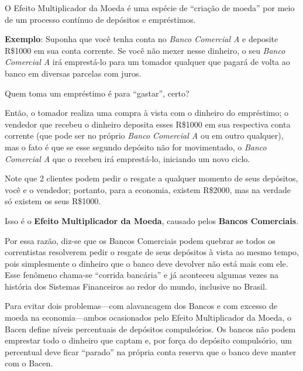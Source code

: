 \documentclass{article}\usepackage[]{graphicx}\usepackage[]{xcolor}
\begin{document}
O Efeito Multiplicador da Moeda é uma espécie de \enquote{criação de moeda} por meio de um processo contínuo 
de depósitos e empréstimos.\par

\textbf{Exemplo}: Suponha que você tenha conta no \textit{Banco Comercial A} e deposite R\$\num{1000} em sua conta corrente. 
Se você não mexer nesse dinheiro, o seu \textit{Banco Comercial A} irá emprestá-lo para um tomador qualquer que pagará 
de volta ao banco em diversas parcelas com juros.\par

Quem toma um empréstimo é para \enquote{gastar}, certo?\par

Então, o tomador realiza uma compra à vista com o dinheiro do empréstimo; o vendedor que recebeu o dinheiro deposita 
esses R\$\num{1000} em sua respectiva conta corrente (que pode ser no próprio \textit{Banco Comercial A} ou em outro 
qualquer), mas o fato é que se esse segundo depósito não for movimentado, o \textit{Banco Comercial A} que o recebeu 
irá emprestá-lo, iniciando um novo ciclo.\par

Note que 2 clientes podem pedir o resgate a qualquer momento de seus depósitos, você e o vendedor; portanto, para a 
economia, existem R\$\num{2000}, mas na verdade só existem os seus R\$\num{1000}.\par

Isso é o \textbf{Efeito Multiplicador da Moeda}, causado pelos \textbf{Bancos Comerciais}.\par

Por essa razão, diz-se que os Bancos Comerciais podem quebrar se todos os correntistas resolverem pedir o resgate de 
seus depósitos à vista ao mesmo tempo, pois simplesmente o dinheiro que o banco deve devolver não está mais com ele. 
Esse fenômeno chama-se \enquote{corrida bancária} e já aconteceu algumas vezes na história dos Sistemas Financeiros 
ao redor do mundo, inclusive no Brasil.\par

Para evitar dois problemas---com alavancagem dos Bancos e com excesso de moeda na economia---ambos ocasionados pelo 
Efeito Multiplicador da Moeda, o Bacen define níveis percentuais de depósitos compulsórios. Os bancos não podem 
emprestar todo o dinheiro que captam e, por força do depósito compulsório, um percentual deve ficar \enquote{parado} 
na própria conta reserva que o banco deve manter com o Bacen.\par
\end{document}
